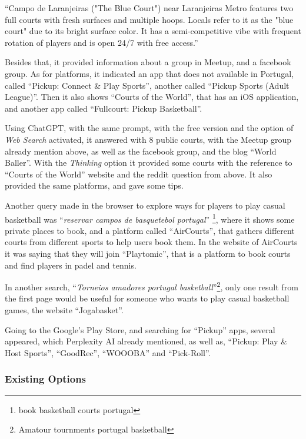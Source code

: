 ``Campo de Laranjeiras ("The Blue Court") near Laranjeiras Metro features two full courts with fresh surfaces and multiple hoops.
Locals refer to it as the "blue court" due to its bright surface color.
It has a semi-competitive vibe with frequent rotation of players and is open 24/7 with free access.''

Besides that, it provided information about a group in Meetup, and a facebook group.
As for platforms, it indicated an app that does not available in Portugal, called ``Pickup: Connect \& Play Sports'', another called ``Pickup Sports (Adult League)''\cite{pickup-adult}.
Then it also shows ``Courts of the World'', that has an iOS application, and another app called ``Fullcourt: Pickup Basketball''\cite{fullcourt}.

Using ChatGPT, with the same prompt, with the free version and the option of \textit{Web Search} activated, it answered with 8 public courts, with the Meetup group already mention above, as well as the facebook group, and the blog ``World Baller''\cite{chatgpt1}.
With the \textit{Thinking} option it provided some courts with the reference to ``Courts of the World'' website and the reddit question from above.
It also provided the same platforms, and gave some tips\cite{chatgpt2}.

Another query made in the browser to explore ways for players to play casual basketball was ``\textit{reservar campos de basquetebol portugal}'' \footnote{book basketball courts portugal}, where it shows some private places to book, and a platform called ``AirCourts''\cite{aircourts}, that gathers different courts from different sports to help users book them.
In the website of AirCourts it was saying that they will join ``Playtomic''\cite{playtonic}, that is a platform to book courts and find players in padel and tennis.

In another search, ``\textit{Torneios amadores portugal basketball}''\footnote{Amatour tournments portugal basketball}, only one result from the first page would be useful for someone who wants to play casual basketball games, the website ``Jogabasket''\cite{jogabasket}.

Going to the Google's Play Store, and searching for ``Pickup'' apps, several appeared, which Perplexity AI already mentioned, as well as, ``Pickup: Play \& Host Sports''\cite{pickup, pickup-app}, ``GoodRec''\cite{goodrec}, ``WOOOBA''\cite{woooba} and ``Pick-Roll''\cite{pick-roll}.


\subsubsection{Existing Options}

